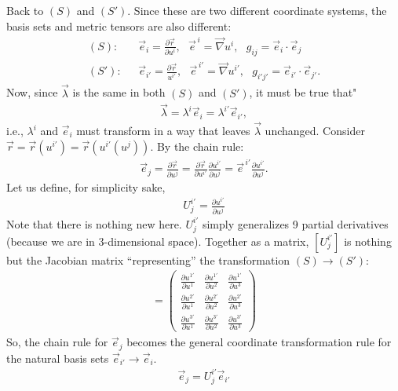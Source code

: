\documentclass{article}
\theoremstyle{definition}
\begin{document}
Back to $(S)$ and $(S')$. Since these are two different coordinate systems, the basis sets and metric tensors are also different:
\begin{align*}
(S): &\text{ }\vec{e}_i = \frac{\partial \vec{r}}{\partial u^i}, \text{ }\vec{e}^{\,i} = \vec{\nabla}u^i, \text{ }g_{ij} = \vec{e}_i\cdot\vec{e}_j\\
(S'): &\text{ }\vec{e}_{i'} = \frac{\partial \vec{r}}{u^{i'}}, \text{ }\vec{e}^{\,i'} = \vec{\nabla} u^{i'}, \text{ }g_{i'j'} = \vec{e}_{i'}\cdot\vec{e}_{j'}.
\end{align*}
Now, since $\vec{\lambda}$ is the same in both $(S)$ and $(S')$, it must be true that"
\begin{align*}
\vec{\lambda} = \lambda^i\vec{e}_i = \lambda^{i'}\vec{e}_{i'},
\end{align*}
i.e., $\lambda^i$ and $\vec{e}_i$ must transform in a way that leaves $\vec{\lambda}$ unchanged. Consider $\vec{r} = \vec{r}(u^{i'}) = \vec{r}(u^{i'}(u^j))$. By the chain rule:
\begin{align*}
\vec{e}_j = \frac{\partial \vec{r}}{\partial u^j} = \frac{\partial \vec{r}}{\partial u^{i'}}\frac{\partial u^{i'}}{\partial u^j} = \vec{e}^{\,i'}\frac{\partial u^{i'}}{\partial u^j}.
\end{align*}
Let us define, for simplicity sake,
\begin{align*}
\boxed{U^{i'}_j = \frac{\partial u^{i'}}{\partial u^j}}
\end{align*}
Note that there is nothing new here. $U^{i'}_j$ simply generalizes 9 partial derivatives (because we are in 3-dimensional space). Together as a matrix, $[U^{i'}_j]$ is nothing but the Jacobian matrix ``representing'' the transformation $(S) \rightarrow (S')$:
\begin{align*}
[U^{i'}_j] = 
\begin{pmatrix}
\frac{\partial u^{1'}}{\partial u^1} & \frac{\partial u^{1'}}{\partial u^2} & \frac{\partial u^{1'}}{\partial u^3}\\
\frac{\partial u^{2'}}{\partial u^1} & \frac{\partial u^{2'}}{\partial u^2} & \frac{\partial u^{2'}}{\partial u^3}\\
\frac{\partial u^{3'}}{\partial u^1} & \frac{\partial u^{3'}}{\partial u^2} & \frac{\partial u^{3'}}{\partial u^3}
\end{pmatrix}
\end{align*}
So, the chain rule for $\vec{e}_j$ becomes the general coordinate transformation rule for the natural basis sets $\vec{e}_{i'} \rightarrow \vec{e}_i$. 
\begin{align*}
\boxed{\vec{e}_j = U^{i'}_j\vec{e}_{i'}}
\end{align*}
\end{document}
